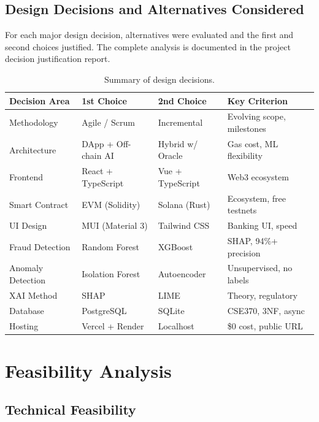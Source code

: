 \documentclass[11pt,a4paper]{article}
\newcommand{\tableheadfont}{\bfseries\small\color{PrimaryBlue}}
\newenvironment{moderntable}[1][H]{%
    \begin{table}[#1]\centering\small%
    \renewcommand{\arraystretch}{1.35}%
}{%
    \end{table}%
}
\begin{document}
\subsection{Design Decisions and Alternatives Considered}

For each major design decision, alternatives were evaluated and the first and second choices justified. The complete analysis is documented in the project decision justification report.

\begin{moderntable}
\caption{Summary of design decisions.}
\begin{tabular}{@{} >{\raggedright}p{2.5cm} >{\raggedright}p{2.8cm} >{\raggedright}p{2.8cm} >{\raggedright\arraybackslash}p{3.5cm} @{}}
\toprule
\tableheadfont Decision Area & \tableheadfont 1st Choice & \tableheadfont 2nd Choice & \tableheadfont Key Criterion \\
\midrule
\rowcolor{RowShade}
Methodology & Agile / Scrum & Incremental & Evolving scope, milestones \\
Architecture & DApp + Off-chain AI & Hybrid w/ Oracle & Gas cost, ML flexibility \\
\rowcolor{RowShade}
Frontend & React + TypeScript & Vue + TypeScript & Web3 ecosystem \\
Smart Contract & EVM (Solidity) & Solana (Rust) & Ecosystem, free testnets \\
\rowcolor{RowShade}
UI Design & MUI (Material 3) & Tailwind CSS & Banking UI, speed \\
Fraud Detection & Random Forest & XGBoost & SHAP, 94\%+ precision \\
\rowcolor{RowShade}
Anomaly Detection & Isolation Forest & Autoencoder & Unsupervised, no labels \\
XAI Method & SHAP & LIME & Theory, regulatory \\
\rowcolor{RowShade}
Database & PostgreSQL & SQLite & CSE370, 3NF, async \\
Hosting & Vercel + Render & Localhost & \$0 cost, public URL \\
\bottomrule
\end{tabular}
\end{moderntable}

\section{Feasibility Analysis}

\subsection{Technical Feasibility}
\end{document}
